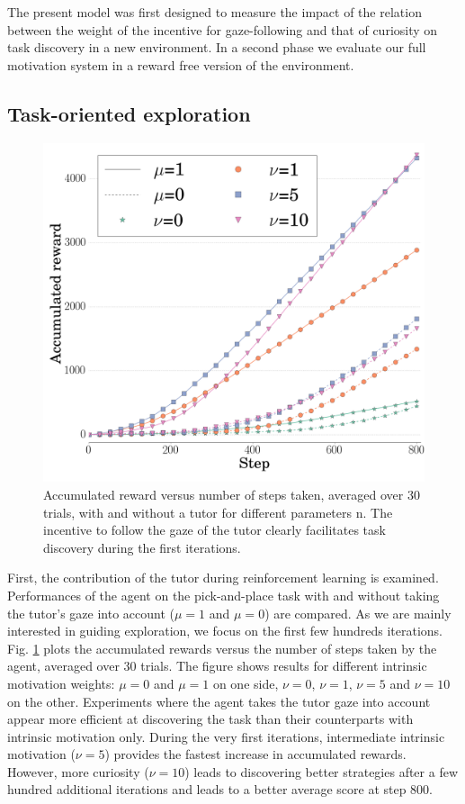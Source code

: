 \documentclass[letterpaper, 10 pt, conference]{ieeeconf}  %
\begin{document}
The present model was first designed to measure the impact of the relation between the weight of the incentive for gaze-following and that of curiosity on task discovery in a new environment. In a second phase we evaluate our full motivation system in a reward free version of the environment.

\subsection{Task-oriented exploration}

\begin{figure}[t!]
\includegraphics[width=\linewidth]{comparaisonNormale2.png}
\caption{Accumulated reward versus number of steps taken, averaged over 30 trials, with and without a tutor for different parameters n. The incentive to follow the gaze of the tutor clearly facilitates task discovery during the first iterations.}
\label{comparaisonNormale}
\end{figure}

First, the contribution of the tutor during reinforcement learning is examined. Performances of the agent on the pick-and-place task with and without taking the tutor's gaze into account ($\mu =1$ and $\mu =0$) are compared. As we are mainly interested in guiding exploration, we focus on the first few hundreds iterations. Fig. \ref{comparaisonNormale} plots the accumulated rewards versus the number of steps taken by the agent, averaged over 30 trials. The figure shows results for different intrinsic motivation weights: $\mu=0$ and $\mu=1$ on one side, $\nu=0$, $\nu=1$, $\nu=5$ and $\nu=10$ on the other. Experiments where the agent takes the tutor gaze into account appear more efficient at discovering the task than their counterparts with intrinsic motivation only. During the very first iterations, intermediate intrinsic motivation ($\nu=5$) provides the fastest increase in accumulated rewards. However, more curiosity ($\nu=10$) leads to discovering better strategies after a few hundred additional iterations and leads to a better average score at step 800. 
\end{document}
